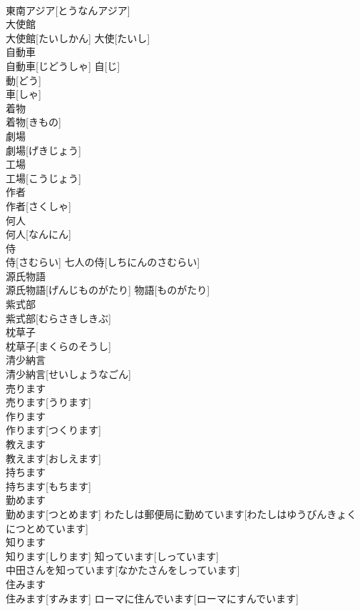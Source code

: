 \documentclass[8pt]{extreport}
\begin{document}
\begin{CJK}{UTF8}{min}
\\	東南アジア[とうなんアジア] 
\\	大使館	
\\	大使館[たいしかん]	大使[たいし] 
\\	自動車	
\\	自動車[じどうしゃ]	自[じ] 
\\	動[どう] 
\\	車[しゃ] 
\\	着物	
\\	着物[きもの]	
\\	劇場	
\\	劇場[げきじょう]	
\\	工場	
\\	工場[こうじょう]	
\\	作者	
\\	作者[さくしゃ]	
\\	何人	
\\	何人[なんにん]	
\\	侍	
\\	侍[さむらい]	七人の侍[しちにんのさむらい] 
\\	源氏物語	
\\	源氏物語[げんじものがたり]	物語[ものがたり] 
\\	紫式部	
\\	紫式部[むらさきしきぶ]	
\\	枕草子	
\\	枕草子[まくらのそうし]	
\\	清少納言	
\\	清少納言[せいしょうなごん]	
\\	売ります	
\\	売ります[うります]	
\\	作ります	
\\	作ります[つくります]	
\\	教えます	
\\	教えます[おしえます]	
\\	持ちます	
\\	持ちます[もちます]	
\\	勤めます	
\\	勤めます[つとめます]	わたしは郵便局に勤めています[わたしはゆうびんきょくにつとめています] 
\\	知ります	
\\	知ります[しります]	知っています[しっています] 
\\	中田さんを知っています[なかたさんをしっています] 
\\	住みます	
\\	住みます[すみます]	ローマに住んでいます[ローマにすんでいます] 

\end{CJK}
\end{document}
